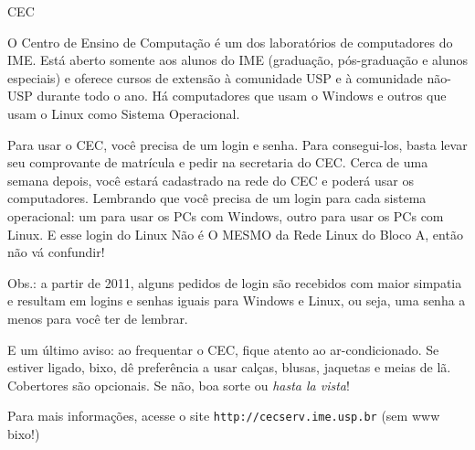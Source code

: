 \begin{secao}{CEC}

O Centro de Ensino de Computação é um dos laboratórios de computadores do IME. Está
aberto somente aos alunos do IME (graduação, pós-graduação e alunos especiais)
e oferece cursos de extensão à comunidade USP e à comunidade não-USP durante
todo o ano. Há computadores que usam o Windows e outros que usam o Linux como
Sistema Operacional.

Para usar o CEC, você precisa de um login e senha. Para consegui-los, basta
levar seu comprovante de matrícula e pedir na secretaria do CEC. Cerca de uma
semana depois, você estará cadastrado na rede do CEC e poderá usar os
computadores. Lembrando que você precisa de um login para cada sistema
operacional: um para usar os PCs com Windows, outro para usar os PCs com Linux.
E esse login do Linux Não é O MESMO da Rede Linux do Bloco A, então não vá
confundir!


Obs.: a partir de 2011, alguns pedidos de login são recebidos com maior simpatia e
resultam em logins e senhas iguais para Windows e Linux, ou seja, uma senha a
menos para você ter de lembrar.

E um último aviso: ao frequentar o CEC, fique atento ao ar-condicionado. Se
estiver ligado, bixo, dê preferência a usar calças, blusas, jaquetas e meias de
lã. Cobertores são opcionais. Se não, boa sorte ou \textit{hasta la vista}!

Para mais informações, acesse o site {\tt http://cecserv.ime.usp.br} (sem www bixo!)
\end{secao}
